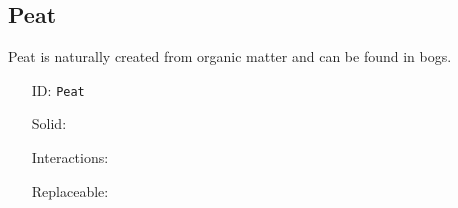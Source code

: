 \subsection{Peat}\label{subsec:blocks_peat}
Peat is naturally created from organic matter and can be found in bogs.
\newline
\begin{itemize}[nosep]
\item[ID:] \texttt{Peat}
\item[Solid:]  \Checkmark \item[Interactions:]  \XSolidBrush \item[Replaceable:]  \XSolidBrush \end{itemize}

